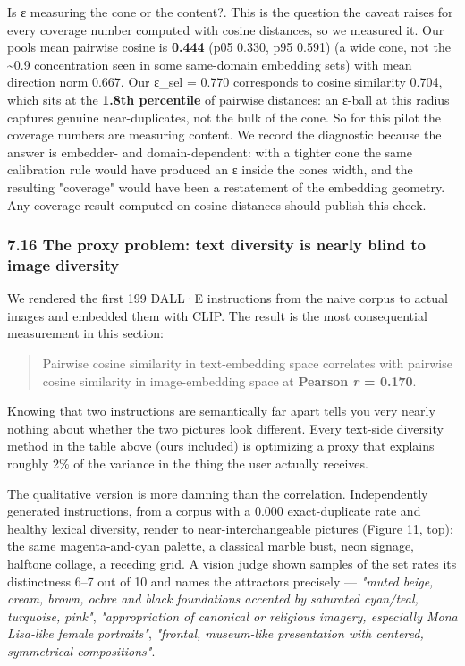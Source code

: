 \documentclass[
  10pt,
]{article}
\theoremstyle{plain}
\theoremstyle{definition}
\begin{document}
Is ε measuring the cone or the content?. This is the question the caveat
raises for every coverage number computed with cosine distances, so we
measured it. Our pool\textquotesingle s mean pairwise cosine is
\textbf{0.444} (p05 0.330, p95 0.591) (a wide cone, not the
\textasciitilde0.9 concentration seen in some same-domain embedding
sets) with mean direction norm 0.667. Our ε\_sel = 0.770 corresponds to
cosine similarity 0.704, which sits at the \textbf{1.8th percentile} of
pairwise distances: an ε-ball at this radius captures genuine
near-duplicates, not the bulk of the cone. So for this pilot the
coverage numbers are measuring content. We record the diagnostic because
the answer is embedder- and domain-dependent: with a tighter cone the
same calibration rule would have produced an ε inside the
cone\textquotesingle s width, and the resulting "coverage" would have
been a restatement of the embedding geometry. Any coverage result
computed on cosine distances should publish this check.

\subsubsection{7.16 The proxy problem: text diversity is nearly blind to
image
diversity}\label{716-the-proxy-problem-text-diversity-is-nearly-blind-to-image-diversity}

We rendered the first 199 DALL·E instructions from the naive corpus to
actual images and embedded them with CLIP. The result is the most
consequential measurement in this section:

\begin{quote}
Pairwise cosine similarity in text-embedding space correlates with
pairwise cosine similarity in image-embedding space at \textbf{Pearson
\emph{r} = 0.170}.
\end{quote}

Knowing that two instructions are semantically far apart tells you very
nearly nothing about whether the two pictures look different. Every
text-side diversity method in the table above (ours included) is
optimizing a proxy that explains roughly 2\% of the variance in the
thing the user actually receives.

The qualitative version is more damning than the correlation.
Independently generated instructions, from a corpus with a 0.000
exact-duplicate rate and healthy lexical diversity, render to
near-interchangeable pictures (Figure 11, top): the same
magenta-and-cyan palette, a classical marble bust, neon signage,
halftone collage, a receding grid. A vision judge shown samples of the
set rates its distinctness 6--7 out of 10 and names the attractors
precisely --- \emph{"muted beige, cream, brown, ochre and black
foundations accented by saturated cyan/teal, turquoise, pink"},
\emph{"appropriation of canonical or religious imagery, especially Mona
Lisa-like female portraits"}, \emph{"frontal, museum-like presentation
with centered, symmetrical compositions"}.
\end{document}
